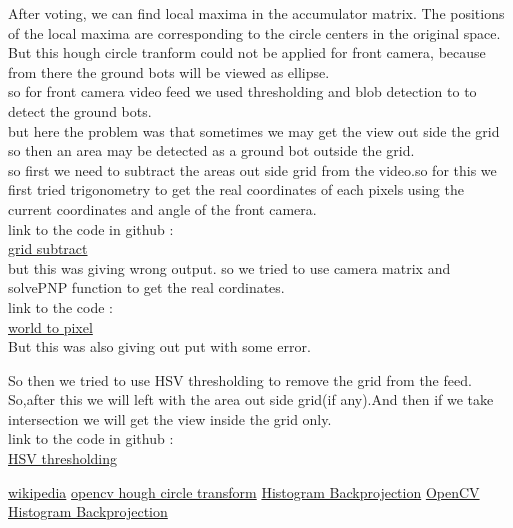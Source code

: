 \documentclass[letterpaper, 10 pt, conference]{ieeeconf}
\begin{document}
After voting, we can find local maxima in the accumulator matrix. The positions of the local maxima are corresponding to the circle centers in the original space. \\

But this hough circle tranform could not be applied for front camera, because from there the ground bots will be viewed as ellipse.\\

so for front camera video feed we used thresholding and blob detection to to detect the ground bots.\\

but here the problem was that sometimes we may get the view out side the grid so then an area may be detected as a ground bot outside the grid.\\

so first we need to subtract the areas out side grid from the video.so for this we first tried trigonometry to get the real coordinates of each pixels using the current coordinates and angle of the front camera.\\

link to the code in github :\\
\href{https://github.com/Saikat2019/IARC\_onlyImgProc/blob/master/gridSubt2.cpp}{grid subtract}\\

but this was giving wrong output. so we tried to use camera matrix and solvePNP function to get the real cordinates.\\
link to the code :\\
\href{https://github.com/Saikat2019/IARC_onlyImgProc/blob/master/wtp2.cpp}{world to pixel}\\
But this was also giving out put with some error.

So then we tried to use HSV thresholding to remove the grid from the feed.
So,after this we will left with the area out side grid(if any).And then if we take intersection we will get the view inside the grid only.\\

link to the code in github :\\
\href{https://github.com/Saikat2019/IARC_onlyImgProc/blob/master/GridSubtFinal.cpp}{HSV thresholding}

\begin{thebibliography}{99} 
\href{https://en.wikipedia.org/wiki/Circle_Hough_Transform}{wikipedia} 
\href{https://docs.opencv.org/3.4/d4/d70/tutorial_hough_circle.html}{opencv hough circle transform} 
\href{http://www.lira.dist.unige.it/teaching/SINA_08-09/slides-prev/sina-image-processing-point.pdf}{Histogram Backprojection}
\href{https://docs.opencv.org/2.4/doc/tutorials/imgproc/histograms/back_projection/back_projection.html}{OpenCV Histogram Backprojection}
\end{thebibliography}
\end{document}
